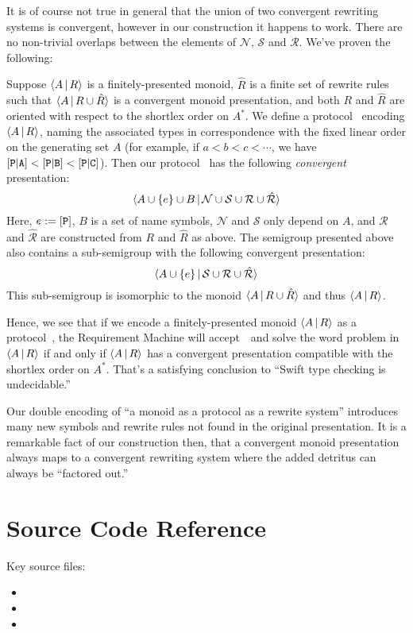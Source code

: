\documentclass[../generics]{subfiles}
\begin{document}
\begin{example}
It is of course not true in general that the union of two convergent rewriting systems is convergent, however in our construction it happens to work. There are no non-trivial overlaps between the elements of $\mathcal{N}$, $\mathcal{S}$ and $\mathcal{R}$. We've proven the following:
\begin{theorem}
Suppose $\langle A\,|\,R\rangle$ is a finitely-presented monoid, $\hat{R}$ is a finite set of rewrite rules such that $\langle A\,|\,R\cup\hat{R}\rangle$ is a convergent monoid presentation, and both $R$ and $\hat{R}$ are oriented with respect to the shortlex order on $A^*$. We define a protocol \tP\ encoding $\langle A\,|\,R\rangle$, naming the associated types in correspondence with the fixed linear order on the generating set $A$ (for example, if $a<b<c<\cdots$, we have $[\texttt{P}|\texttt{A}]<[\texttt{P}|\texttt{B}]<[\texttt{P}|\texttt{C}]$). Then our protocol \tP\ has the following \emph{convergent} presentation:
\[\langle A\cup\{e\}\cup B\,|\,\mathcal{N}\cup\mathcal{S}\cup\mathcal{R}\cup\hat{\mathcal{R}}\rangle\]
Here, $e:=[\texttt{P}]$, $B$ is a set of name symbols, $\mathcal{N}$ and $\mathcal{S}$ only depend on $A$, and $\mathcal{R}$ and $\hat{\mathcal{R}}$ are constructed from $R$ and $\hat{R}$ as above. The semigroup presented above also contains a sub-semigroup with the following convergent presentation:
\[\langle A\cup\{e\}\,|\,\mathcal{S}\cup\mathcal{R}\cup\hat{\mathcal{R}}\rangle\]
This sub-semigroup is isomorphic to the monoid $\langle A\,|\,R\cup\hat{R}\rangle$ and thus $\langle A\,|\,R\rangle$.
\end{theorem}

Hence, we see that if we encode a finitely-presented monoid $\langle A\,|\,R\rangle$ as a protocol~\tP, the Requirement Machine will accept~\tP\ and solve the word problem in $\langle A\,|\,R\rangle$ if and only if $\langle A\,|\,R\rangle$ has a convergent presentation compatible with the shortlex order on $A^*$. That's a satisfying conclusion to ``Swift type checking is undecidable.''

Our double encoding of ``a monoid as a protocol as a rewrite system'' introduces many new symbols and rewrite rules not found in the original presentation. It is a remarkable fact of our construction then, that a convergent monoid presentation always maps to a convergent rewriting system where the added detritus can always be ``factored out.''
\end{example}

\section{Source Code Reference}\label{completion sourceref}

Key source files:
\begin{itemize}
\item {}
\item {}
\item {}
\end{itemize}
\end{document}
